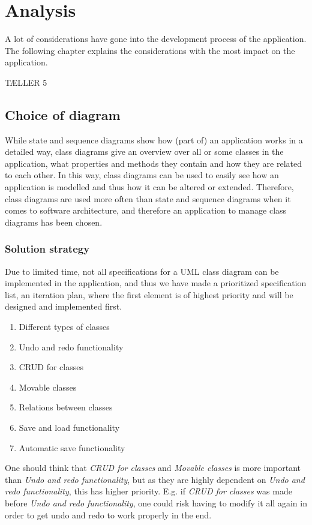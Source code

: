 \chapter{Analysis}
\label{sec:analysis}
A lot of considerations have gone into the development process of the application. The following chapter explains the considerations with the most impact on the application.

TÆLLER 5

\section{Choice of diagram}
\label{sec:choice_diagram}

While state and sequence diagrams show how (part of) an application works in a detailed way, class diagrams give an overview over all or some classes in the application, what properties and methods they contain and how they are related to each other. In this way, class diagrams can be used to easily see how an application is modelled and thus how it can be altered or extended. Therefore, class diagrams are used more often than state and sequence diagrams when it comes to software architecture, and therefore an application to manage class diagrams has been chosen.

\subsection{Solution strategy}
\label{sec:sol_strat}

Due to limited time, not all specifications for a UML class diagram can be implemented in the application, and thus we have made a prioritized specification list, an iteration plan, where the first element is of highest priority and will be designed and implemented first.

\begin{enumerate}
  \item Different types of classes
  \item Undo and redo functionality
  \item CRUD for classes
  \item Movable classes
  \item Relations between classes
  \item Save and load functionality
  \item Automatic save functionality
\end{enumerate}

One should think that \textit{CRUD for classes} and \textit{Movable classes} is more important than \textit{Undo and redo functionality}, but as they are highly dependent on \textit{Undo and redo functionality}, this has higher priority. E.g. if \textit{CRUD for classes} was made before \textit{Undo and redo functionality}, one could risk having to modify it all again in order to get undo and redo to work properly in the end.

